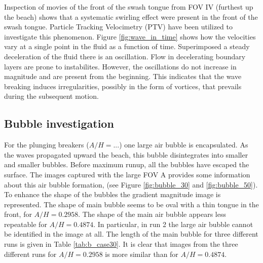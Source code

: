 \documentclass[a4paper, 11pt, english, twoside, openright]{article}
\begin{document}
Inspection of movies of the front of the swash tongue from FOV IV (furthest up the beach) shows that a systematic swirling effect were present in the front of the swash tongue.  Particle Tracking Velocimetry (PTV) have been utilized to investigate this phenomenon. Figure \ref{fig:wave_in_time} shows how the velocities vary at a single point in the
fluid as a function of time.
Superimposed a steady deceleration of the fluid there is an 
oscillation.
Flow in decelerating boundary layers are prone to instabilites.
However, the oscillations do not increase in magnitude and are present
from the beginning. 
   This indicates that the wave breaking induces irregularities, possibly in the form of vortices, that prevails during the subsequent motion. 


 
 \subsection{Bubble investigation}
 \label{bub_inv}
 For the plunging breakers ($A/H=...$) one large air bubble is encapsulated. As the waves propagated upward the beach, this bubble disintegrates into smaller and smaller bubbles. Before maximum runup,  all the 
bubbles  have escaped the surface. The images captured with the large FOV A provides some information about this air bubble formation, (see Figure \ref{fig:bubble_30} and \ref{fig:bubble_50}). To enhance the shape of the bubbles the gradient magnitude image is represented. The shape of main bubble seems to be oval with a thin tongue in the front, for $A/H=0.2958$. The shape of the main air bubble appears less repeatable for $A/H=0.4874$. In particular, in run 2 the large air bubble cannot
 be identified in the image at all. The length of the main bubble for three different runs is given in Table \ref{tab:b_case30}. It is clear that images from the three different runs for $A/H=0.2958$ is more similar than for $A/H=0.4874$. 
\end{document}
